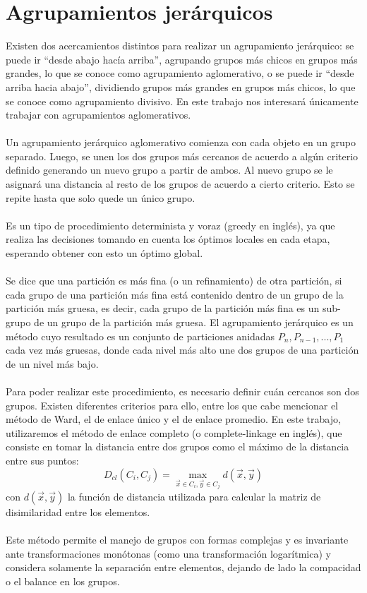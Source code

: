 \section{Agrupamientos jerárquicos}
Existen dos acercamientos distintos para realizar un agrupamiento jerárquico: se puede ir ``desde abajo hacía arriba'', agrupando grupos más chicos en grupos más grandes, lo que se conoce como agrupamiento aglomerativo, o se puede ir ``desde arriba hacia abajo'', dividiendo grupos más grandes en grupos más chicos, lo que se conoce como agrupamiento divisivo. En este trabajo nos interesará únicamente trabajar con agrupamientos aglomerativos.\\\\
Un agrupamiento jerárquico aglomerativo comienza con cada objeto en un grupo separado. Luego, se unen los dos grupos más cercanos de acuerdo a algún criterio definido generando un nuevo grupo a partir de ambos. Al nuevo grupo se le asignará una distancia al resto de los grupos de acuerdo a cierto criterio. Esto se repite hasta que solo quede un único grupo.\\\\
Es un tipo de procedimiento determinista y voraz (greedy en inglés), ya que realiza las decisiones tomando en cuenta los óptimos locales en cada etapa, esperando obtener con esto un óptimo global.\\\\
Se dice que una partición es más fina (o un refinamiento) de otra partición, si cada grupo de una partición más fina está contenido dentro de un grupo de la partición más gruesa, es decir, cada grupo de la partición más fina es un sub-grupo de un grupo de la partición más gruesa. El agrupamiento jerárquico es un método cuyo resultado es un conjunto de particiones anidadas $P_n, P_{n-1}, ..., P_1$ cada vez más gruesas, donde cada nivel más alto une dos grupos de una partición de un nivel más bajo.\\\\
Para poder realizar este procedimiento, es necesario definir cuán cercanos son dos grupos. Existen diferentes criterios para ello, entre los que cabe mencionar el método de Ward, el de enlace único y el de enlace promedio. En este trabajo, utilizaremos el método de enlace completo (o complete-linkage en inglés), que consiste en tomar la distancia entre dos grupos como el máximo de la distancia entre sus puntos:
\begin{equation}
	D_{cl}(C_i, C_j) = \max\limits_{\vec{x} \in C_i, \vec{y} \in C_j} d(\vec{x}, \vec{y})
\end{equation}
con $d(\vec{x}, \vec{y})$ la función de distancia utilizada para calcular la matriz de disimilaridad entre los elementos.\\\\
Este método permite el manejo de grupos con formas complejas y es invariante ante transformaciones monótonas (como una transformación logarítmica) \cite{Johnson1967} y considera solamente la separación entre elementos, dejando de lado la compacidad o el balance en los grupos.\cite{Shalizi2009, Gan2007}
